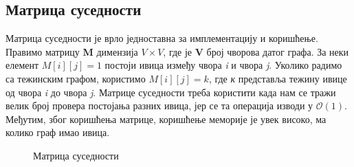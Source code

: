 \documentclass[11pt, oneside, a4paper]{article}
\begin{document}
\subsection*{Матрица суседности}
Матрица суседности је врло једноставна за имплементацију и коришћење. Правимо матрицу \textbf{M} димензија $V \times V$, где је \textbf{V} број чворова датог графа. За неки елемент $M[i][j] = 1$ постоји ивица између чвора \textit{i} и чвора \textit{j}. Уколико радимо са тежинским графом, користимо $M[i][j] = k$, где \textit{к} представља тежину ивице од чвора \textit{i} до чвора \textit{j}. Матрице суседности треба користити када нам се тражи велик број провера постојања разних ивица, јер се та операција изводи у $\mathcal{O}(1)$. Међутим, због коришћења матрице, коришћење меморије је увек високо, ма колико граф имао ивица. 
\begin{figure}[h]
    \begin{minipage}{0.3\textwidth}
        \centering
    
    \end{minipage}\hfill
    \begin{minipage}{0.6\textwidth}
        \centering
    \end{minipage}
    
    \caption{Матрица суседности}
    \label{fig:my_label}
\end{figure}
\end{document}
